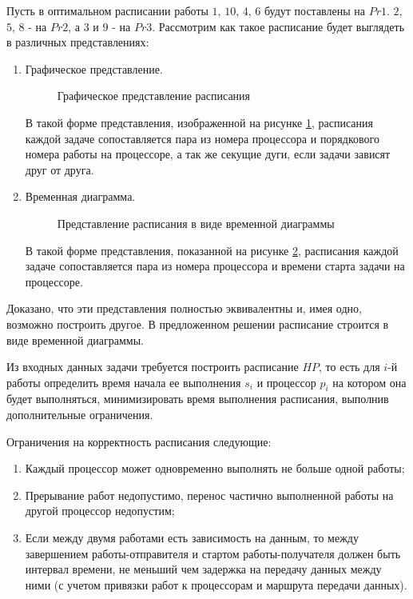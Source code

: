 Пусть в оптимальном расписании работы $1$, $10$, $4$, $6$ будут поставлены на $Pr1$. $2$, $5$, $8$ - на $Pr2$, а $3$ и $9$ - на $Pr3$. Рассмотрим как такое расписание будет выглядеть в различных представлениях:
\begin{enumerate}
    \item Графическое представление.

    \begin{figure}[!htbp]
        \caption{Графическое представление расписания}
        \label{fig:graphical-form}
    \end{figure}
    В такой форме представления, изображенной на рисунке \ref{fig:graphical-form}, расписания каждой задаче сопоставляется пара из номера процессора и порядкового номера работы на процессоре, а так же секущие дуги, если задачи зависят друг от друга. 
    \item Временная диаграмма.

    \begin{figure}[!htbp]
        \caption{Представление расписания в виде временной диаграммы}
        \label{fig:time-diagram}
    \end{figure}
    В такой форме представления, показанной на рисунке \ref{fig:time-diagram}, расписания каждой задаче сопоставляется пара из номера процессора и времени старта задачи на процессоре.
\end{enumerate}
Доказано, что эти представления полностью эквивалентны и, имея одно, возможно построить другое. В предложенном решении расписание строится в виде временной диаграммы.

Из входных данных задачи требуется построить расписание $HP$, то есть для $i$-й работы определить время начала ее выполнения $s_i$ и процессор $p_i$ на котором она будет выполняться, минимизировать время выполнения расписания, выполнив дополнительные ограничения.


Ограничения на корректность расписания следующие:
\begin{enumerate}
    \item Каждый процессор может одновременно выполнять не больше одной работы;
    \item Прерывание работ недопустимо, перенос частично выполненной работы на другой процессор недопустим;
    \item Если между двумя работами есть зависимость на данным, то между завершением работы-отправителя и стартом работы-получателя должен быть интервал времени, не меньший чем задержка на передачу данных между ними (с учетом привязки работ к процессорам и маршрута передачи данных).
\end{enumerate}

